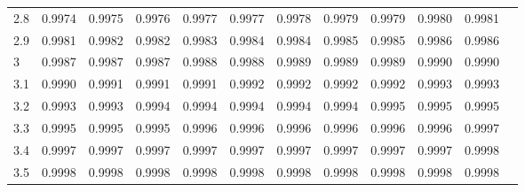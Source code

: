\begin{table}[!htbp]
\begin{tabularx}{\linewidth}{@{}BYZYZYZYZYZY@{}}
            2.8 & 0.9974     & 0.9975        & 0.9976        & 0.9977        & 0.9977        & 0.9978        & 0.9979        & 0.9979        & 0.9980        & 0.9981        \\
            2.9 & 0.9981     & 0.9982        & 0.9982        & 0.9983        & 0.9984        & 0.9984        & 0.9985        & 0.9985        & 0.9986        & 0.9986        \\
            3   & 0.9987     & 0.9987        & 0.9987        & 0.9988        & 0.9988        & 0.9989        & 0.9989        & 0.9989        & 0.9990        & 0.9990        \\
            3.1 & 0.9990     & 0.9991        & 0.9991        & 0.9991        & 0.9992        & 0.9992        & 0.9992        & 0.9992        & 0.9993        & 0.9993        \\
            3.2 & 0.9993     & 0.9993        & 0.9994        & 0.9994        & 0.9994        & 0.9994        & 0.9994        & 0.9995        & 0.9995        & 0.9995        \\
            3.3 & 0.9995     & 0.9995        & 0.9995        & 0.9996        & 0.9996        & 0.9996        & 0.9996        & 0.9996        & 0.9996        & 0.9997        \\
            3.4 & 0.9997     & 0.9997        & 0.9997        & 0.9997        & 0.9997        & 0.9997        & 0.9997        & 0.9997        & 0.9997        & 0.9998        \\
            3.5 & 0.9998     & 0.9998        & 0.9998        & 0.9998        & 0.9998        & 0.9998        & 0.9998        & 0.9998        & 0.9998        & 0.9998
      \end{tabularx}
\end{table}
\newpage
